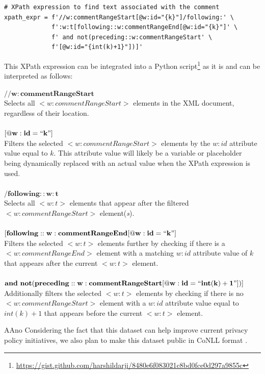 \documentclass{IOS-Book-Article}
\begin{document}
\begin{mdframed}
\begin{verbatim}
# XPath expression to find text associated with the comment
xpath_expr = f'//w:commentRangeStart[@w:id="{k}"]/following:' \
             f':w:t[following::w:commentRangeEnd[@w:id="{k}"]' \
             f' and not(preceding::w:commentRangeStart' \
             f'[@w:id="{int(k)+1}"])]'
\end{verbatim}
\end{mdframed}

This XPath expression can be integrated into a Python script\footnote{\url{https://gist.github.com/harshildarji/8480e6f083021c8bd0fce0d297a9855c}} as it is and can be interpreted as follows:

\begin{mdframed}
$\mathbf{//w:commentRangeStart}$\\
Selects all $<w:commentRangeStart>$ elements in the XML document, regardless of their location.\\\\
$\mathbf{[@w:id=``{k}"]}$\\
Filters the selected $<w:commentRangeStart>$ elements by the $w:id$ attribute value equal to ${k}$. This attribute value will likely be a variable or placeholder being dynamically replaced with an actual value when the XPath expression is used.\\\\
$\mathbf{/following::w:t}$\\
Selects all $<w:t>$ elements that appear after the filtered $<w:commentRangeStart>$ element(\textit{s}).\\\\
$\mathbf{[following::w:commentRangeEnd[@w:id=``{k}"]}$\\
Filters the selected $<w:t>$ elements further by checking if there is a $<w:commentRangeEnd>$ element with a matching $w:id$ attribute value of ${k}$ that appears after the current $<w:t>$ element.\\\\
$\mathbf{and\ not(preceding::w:commentRangeStart[@w:id=``{int(k)+1}"])]}$\\
Additionally filters the selected $<w:t>$ elements by checking if there is no $<w:commentRangeStart>$ element with a $w:id$ attribute value equal to ${int(k)+1}$ that appears before the current $<w:t>$ element.
\end{mdframed}

AAno Considering the fact that this dataset can help improve current privacy policy initiatives, we also plan to make this dataset public in CoNLL format \cite{r14}.
\end{document}
